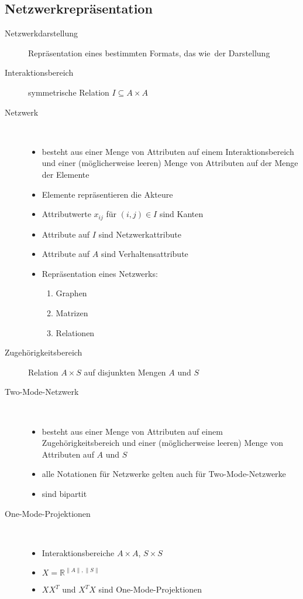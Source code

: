 \subsection{Netzwerkrepräsentation}
	\begin{description}
		\item[Netzwerkdarstellung] Repräsentation eines bestimmten Formats, das \glqq wie\grqq\ der Darstellung
		\item[Interaktionsbereich] symmetrische Relation $I\subseteq A\times A$
		\item[Netzwerk] \ \\\vspace*{-\baselineskip}
			\begin{itemize}
				\item besteht aus einer Menge von Attributen auf einem Interaktionsbereich und einer (möglicherweise leeren) Menge von Attributen auf der Menge der Elemente
				\item Elemente repräsentieren die Akteure
				\item Attributwerte $x_{ij}$ für $(i,j)\in I$ sind Kanten
				\item Attribute auf $I$ sind Netzwerkattribute
				\item Attribute auf $A$ sind Verhaltensattribute
				\item Repräsentation eines Netzwerks:
					\begin{enumerate}
						\item Graphen
						\item Matrizen
						\item Relationen
					\end{enumerate}
			\end{itemize}
		\item[Zugehörigkeitsbereich] Relation $A\times S$ auf disjunkten Mengen $A$ und $S$
	\end{description}
	\topbreak
	\vspace*{-\baselineskip}
	\begin{description}
		\item[Two-Mode-Netzwerk] \ \\\vspace*{-\baselineskip}
			\begin{itemize}
				\item besteht aus einer Menge von Attributen auf einem Zugehörigkeitsbereich und einer (möglicherweise leeren) Menge von Attributen auf $A$ und $S$
				\item alle Notationen für Netzwerke gelten auch für Two-Mode-Netzwerke
				\item sind bipartit
			\end{itemize}
		\item[One-Mode-Projektionen]\ \\\vspace*{-\baselineskip}
			\begin{itemize}
				\item Interaktionsbereiche $A\times A$, $S\times S$
				\item $X=\mathbb{R}^{\|A\|,\|S\|}$
				\item $XX^T$ und $X^TX$ sind One-Mode-Projektionen
			\end{itemize}
	\end{description}
